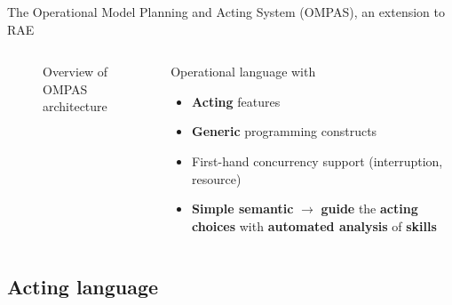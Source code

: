 \begin{frame}{The Operational Model Planning and Acting System (OMPAS), an extension to RAE}
\begin{columns}[t]
\begin{column}{0.5\textwidth}
\begin{figure}
        \caption{Overview of OMPAS architecture}
    \end{figure}
            
        \end{column}
        \pause
        \begin{column}{0.5\textwidth}
        Operational language with
        \begin{itemize}
            \item \textbf{Acting} features
            \item \textbf{Generic} programming constructs
            \item First-hand concurrency support (interruption, resource)
            \item \textbf{Simple semantic} $\rightarrow$ \textbf{guide} the \textbf{acting choices} with \textbf{automated analysis} of \textbf{skills}
        \end{itemize}
        \end{column}
    \end{columns}
\end{frame}

\subsection{Acting language}

